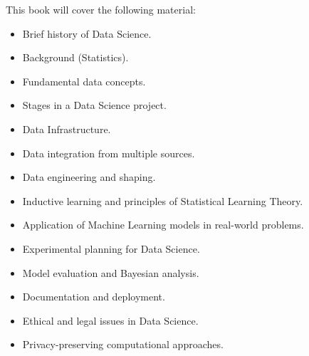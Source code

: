 This book will cover the following material:
\begin{itemize}
  \item Brief history of Data Science.
  \item Background (Statistics).
  \item Fundamental data concepts.
  \item Stages in a Data Science project.
  \item Data Infrastructure.
  \item Data integration from multiple sources.
  \item Data engineering and shaping.
  \item Inductive learning and principles of Statistical Learning Theory.
  \item Application of Machine Learning models in real-world problems.
  \item Experimental planning for Data Science.
  \item Model evaluation and Bayesian analysis.
  \item Documentation and deployment.
  \item Ethical and legal issues in Data Science.
  \item Privacy-preserving computational approaches.
\end{itemize}
